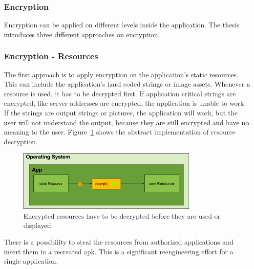 \subsubsection{Encryption} \label{subsection:counter-replace-encryption-content}
Encryption can be applied on different levels inside the application.
The thesis introduces three different approaches on encryption.

\subsubsection{Encryption - Resources} \label{subsection:counter-replace-encryption-content-resource}
The first approach is to apply encryption on the application's static resources.
This can include the application's hard coded strings or image assets.
Whenever a resource is used, it has to be decrypted first.
\newline
If application critical strings are encrypted, like server addresses are encrypted, the application is unable to work.
If the strings are output strings or pictures, the application will work, but the user will not understand the output, because they are still encrypted and have no meaning to the user.
\newline
Figure~\ref{fig:encryptionResource} shows the abstract implementation of resource decryption.
\begin{figure}[h]
    \centering
    \includegraphics[width=0.8\textwidth]{data/encryptionResource.png}
    \caption{Encrypted resources have to be decrypted before they are used or displayed}
    \label{fig:encryptionResource}
\end{figure}
\newline
There is a possibility to steal the resources from authorized applications and insert them in a recreated \gls{apk}.
This is a significant reengineering effort for a single application.

